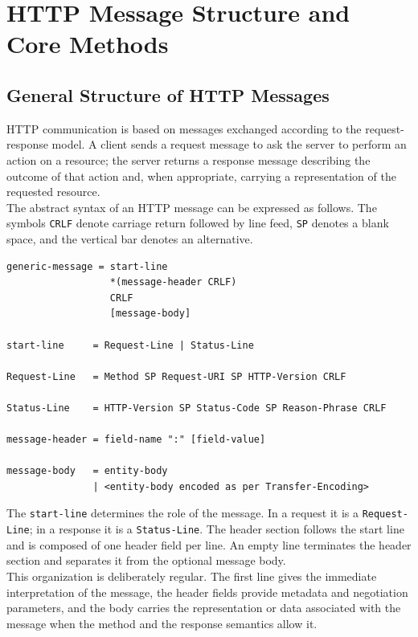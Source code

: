 \documentclass{scrbook}
\begin{document}
\chapter{HTTP Message Structure and Core Methods}

\section{General Structure of HTTP Messages}

HTTP communication is based on messages exchanged according to the request-response model. A client sends a request message to ask the server to perform an action on a resource; the server returns a response message describing the outcome of that action and, when appropriate, carrying a representation of the requested resource.\\

The abstract syntax of an HTTP message can be expressed as follows. The symbols \texttt{CRLF} denote carriage return followed by line feed, \texttt{SP} denotes a blank space, and the vertical bar denotes an alternative.

\begin{lstlisting}
generic-message = start-line
                  *(message-header CRLF)
                  CRLF
                  [message-body]

start-line     = Request-Line | Status-Line

Request-Line   = Method SP Request-URI SP HTTP-Version CRLF

Status-Line    = HTTP-Version SP Status-Code SP Reason-Phrase CRLF

message-header = field-name ":" [field-value]

message-body   = entity-body
               | <entity-body encoded as per Transfer-Encoding>
\end{lstlisting}

The \texttt{start-line} determines the role of the message. In a request it is a \texttt{Request-Line}; in a response it is a \texttt{Status-Line}. The header section follows the start line and is composed of one header field per line. An empty line terminates the header section and separates it from the optional message body.\\

This organization is deliberately regular. The first line gives the immediate interpretation of the message, the header fields provide metadata and negotiation parameters, and the body carries the representation or data associated with the message when the method and the response semantics allow it.
\end{document}
